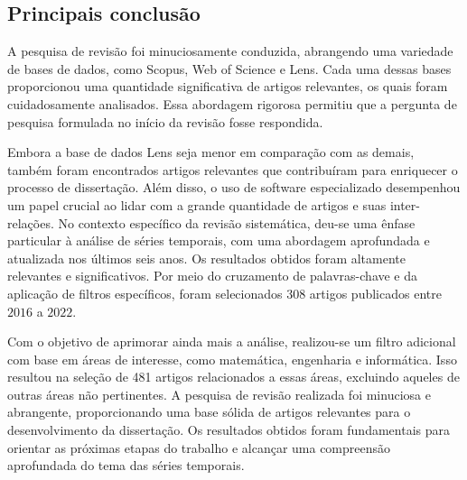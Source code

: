 \subsection{Principais conclus\~ao} \label{subsec:conclusão da revisão}

A pesquisa de revisão foi minuciosamente conduzida, abrangendo uma variedade de bases de dados, como Scopus, Web of Science e Lens. Cada uma dessas bases proporcionou uma quantidade significativa de artigos relevantes, os quais foram cuidadosamente analisados. Essa abordagem rigorosa permitiu que a pergunta de pesquisa formulada no início da revisão fosse respondida.

Embora a base de dados Lens seja menor em comparação com as demais, também foram encontrados artigos relevantes que contribuíram para enriquecer o processo de dissertação. Além disso, o uso de software especializado desempenhou um papel crucial ao lidar com a grande quantidade de artigos e suas inter-relações.
No contexto específico da revisão sistemática, deu-se uma ênfase particular à análise de séries temporais, com uma abordagem aprofundada e atualizada nos últimos seis anos. Os resultados obtidos foram altamente relevantes e significativos. Por meio do cruzamento de palavras-chave e da aplicação de filtros específicos, foram selecionados $308$ artigos publicados entre $2016$ a $2022$.

Com o objetivo de aprimorar ainda mais a análise, realizou-se um filtro adicional com base em áreas de interesse, como matemática, engenharia e informática. Isso resultou na seleção de 481 artigos relacionados a essas áreas, excluindo aqueles de outras áreas não pertinentes.
A pesquisa de revisão realizada foi minuciosa e abrangente, proporcionando uma base sólida de artigos relevantes para o desenvolvimento da dissertação. Os resultados obtidos foram fundamentais para orientar as próximas etapas do trabalho e alcançar uma compreensão aprofundada do tema das séries temporais.